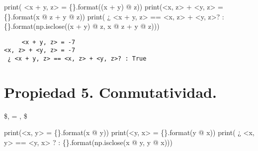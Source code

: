 \documentclass[
  letterpaper,
  DIV=11,
  numbers=noendperiod]{scrreprt}
\newenvironment{Shaded}{\begin{snugshade}}{\end{snugshade}}
\newcommand{\BuiltInTok}[1]{\textcolor[rgb]{0.00,0.23,0.31}{#1}}
\newcommand{\NormalTok}[1]{\textcolor[rgb]{0.00,0.23,0.31}{#1}}
\newcommand{\OperatorTok}[1]{\textcolor[rgb]{0.37,0.37,0.37}{#1}}
\newcommand{\SpecialCharTok}[1]{\textcolor[rgb]{0.37,0.37,0.37}{#1}}
\newcommand{\StringTok}[1]{\textcolor[rgb]{0.13,0.47,0.30}{#1}}
\begin{document}
\begin{Shaded}
\begin{Highlighting}[]
\BuiltInTok{print}\NormalTok{(}\StringTok{\textquotesingle{}     \textless{}x + y, z\textgreater{} = }\SpecialCharTok{\{\}}\StringTok{\textquotesingle{}}\NormalTok{.}\BuiltInTok{format}\NormalTok{((x }\OperatorTok{+}\NormalTok{ y) }\OperatorTok{@}\NormalTok{ z))}
\BuiltInTok{print}\NormalTok{(}\StringTok{\textquotesingle{}\textless{}x, z\textgreater{} + \textless{}y, z\textgreater{} = }\SpecialCharTok{\{\}}\StringTok{\textquotesingle{}}\NormalTok{.}\BuiltInTok{format}\NormalTok{(x }\OperatorTok{@}\NormalTok{ z }\OperatorTok{+}\NormalTok{ y }\OperatorTok{@}\NormalTok{ z))}
\BuiltInTok{print}\NormalTok{(}\StringTok{\textquotesingle{} ¿ \textless{}x + y, z\textgreater{} == \textless{}x, z\textgreater{} + \textless{}y, z\textgreater{}? : }\SpecialCharTok{\{\}}\StringTok{\textquotesingle{}}\NormalTok{.}\BuiltInTok{format}\NormalTok{(np.isclose((x }\OperatorTok{+}\NormalTok{ y) }\OperatorTok{@}\NormalTok{ z, x }\OperatorTok{@}\NormalTok{ z }\OperatorTok{+}\NormalTok{ y }\OperatorTok{@}\NormalTok{ z)))}
\end{Highlighting}
\end{Shaded}

\begin{verbatim}
     <x + y, z> = -7
<x, z> + <y, z> = -7
 ¿ <x + y, z> == <x, z> + <y, z>? : True
\end{verbatim}

\section{Propiedad 5.
Conmutatividad.}\label{propiedad-5.-conmutatividad.}

\$\langle {},  \rangle = \langle {},  \rangle \$

\begin{Shaded}
\begin{Highlighting}[]
\BuiltInTok{print}\NormalTok{(}\StringTok{\textquotesingle{}\textless{}x, y\textgreater{} = }\SpecialCharTok{\{\}}\StringTok{\textquotesingle{}}\NormalTok{.}\BuiltInTok{format}\NormalTok{(x }\OperatorTok{@}\NormalTok{ y))}
\BuiltInTok{print}\NormalTok{(}\StringTok{\textquotesingle{}\textless{}y, x\textgreater{} = }\SpecialCharTok{\{\}}\StringTok{\textquotesingle{}}\NormalTok{.}\BuiltInTok{format}\NormalTok{(y }\OperatorTok{@}\NormalTok{ x))}
\BuiltInTok{print}\NormalTok{(}\StringTok{\textquotesingle{} ¿ \textless{}x, y\textgreater{} == \textless{}y, x\textgreater{} ? : }\SpecialCharTok{\{\}}\StringTok{\textquotesingle{}}\NormalTok{.}\BuiltInTok{format}\NormalTok{(np.isclose(x }\OperatorTok{@}\NormalTok{ y, y }\OperatorTok{@}\NormalTok{ x)))}
\end{Highlighting}
\end{Shaded}
\end{document}
